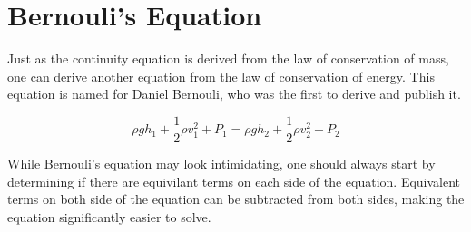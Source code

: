 \section{Bernouli's Equation}

Just as the continuity equation is derived from the law of conservation of mass, one can derive another equation from the law of conservation of energy.  This equation is named for Daniel Bernouli, who was the first to derive and publish it.

				\begin{mdframed}[backgroundcolor=orange!20!white]
		\begin{equation}
			\rho g h_1 + \frac{1}{2} \rho v_1^2 + P_1 = \rho g h_2 + \frac{1}{2} \rho v_2^2 + P_2
			\label{equation:bernouli}
		\end{equation}
	\end{mdframed}	
While Bernouli's equation may look intimidating, one should always start by determining if there are equivilant terms on each side of the equation.  Equivalent terms on both side of the equation can be subtracted from both sides, making the equation significantly easier to solve.  


